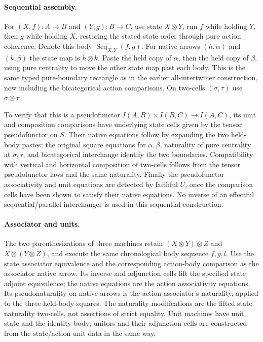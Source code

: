 \documentclass{article}
\begin{document}
\paragraph{Sequential assembly.} For $(X,f):A\to B$ and $(Y,g):B\to C$, use state $X\otimes Y$, run $f$ while holding $Y$, then $g$ while holding $X$, restoring the stated state order through pure action coherence. Denote this body $\operatorname{Seq}_{X,Y}(f,g)$. For native arrows $(h,\alpha)$ and $(k,\beta)$ the state map is $h\otimes k$. Paste the held copy of $\alpha$, then the held copy of $\beta$, using pure centrality to move the other state map past each body. This is the same typed pure-boundary rectangle as in the earlier all-intertwiner construction, now including the bicategorical action comparisons. On two-cells $(\sigma,\tau)$ use $\sigma\otimes\tau$.

To verify that this is a pseudofunctor $I(A,B)\times I(B,C)\to I(A,C)$, its unit and composition comparisons have underlying state cells given by the tensor pseudofunctor on $S$. Their native equations follow by expanding the two held-body pastes: the original square equations for $\alpha,\beta$, naturality of pure centrality at $\sigma,\tau$, and bicategorical interchange identify the two boundaries. Compatibility with vertical and horizontal composition of two-cells follows from the tensor pseudofunctor laws and the same naturality. Finally the pseudofunctor associativity and unit equations are detected by faithful $U$, once the comparison cells have been shown to satisfy their native equations. No inverse of an effectful sequential/parallel interchanger is used in this sequential construction.

\paragraph{Associator and units.} The two parenthesizations of three machines retain $(X\otimes Y)\otimes Z$ and $X\otimes(Y\otimes Z)$, and execute the same chronological body sequence $f,g,l$. Use the state associator equivalence and the corresponding action-body comparison as the associator native arrow. Its inverse and adjunction cells lift the specified state adjoint equivalence; the native equations are the action associativity equations. Its pseudonaturality on native arrows is the action associator's naturality, applied to the three held-body squares. The naturality modifications are the lifted state naturality two-cells, not assertions of strict equality. Unit machines have unit state and the identity body; unitors and their adjunction cells are constructed from the state/action unit data in the same way.
\end{document}
